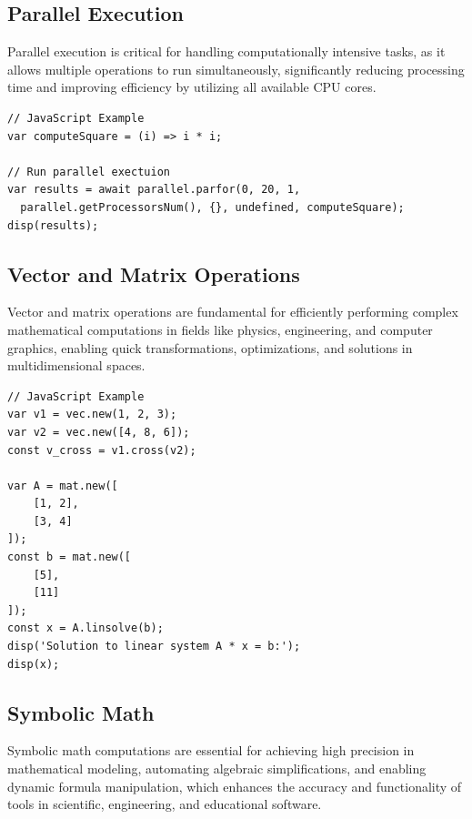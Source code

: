 \documentclass[12pt,a4paper]{article}
\begin{document}
\subsection{Parallel Execution}
\label{sec:parallel-execution}

Parallel execution is critical for handling computationally intensive tasks, as it allows multiple operations to run simultaneously, significantly reducing processing time and improving efficiency by utilizing all available CPU cores.

\begin{lstlisting}[style=JavaScriptStyle]
// JavaScript Example
var computeSquare = (i) => i * i;

// Run parallel exectuion 
var results = await parallel.parfor(0, 20, 1, 
  parallel.getProcessorsNum(), {}, undefined, computeSquare);
disp(results);
\end{lstlisting}

\subsection{Vector and Matrix Operations}
\label{sec:vector-matrix}

Vector and matrix operations are fundamental for efficiently performing complex mathematical computations in fields like physics, engineering, and computer graphics, enabling quick transformations, optimizations, and solutions in multidimensional spaces.

\begin{lstlisting}[style=JavaScriptStyle]
// JavaScript Example
var v1 = vec.new(1, 2, 3);
var v2 = vec.new([4, 8, 6]);
const v_cross = v1.cross(v2);

var A = mat.new([
    [1, 2],
    [3, 4]
]);
const b = mat.new([
    [5],
    [11]
]);
const x = A.linsolve(b);
disp('Solution to linear system A * x = b:');
disp(x);
\end{lstlisting}

\subsection{Symbolic Math}
\label{sec:symbolic-math}

Symbolic math computations are essential for achieving high precision in mathematical modeling, automating algebraic simplifications, and enabling dynamic formula manipulation, which enhances the accuracy and functionality of tools in scientific, engineering, and educational software.
\end{document}
